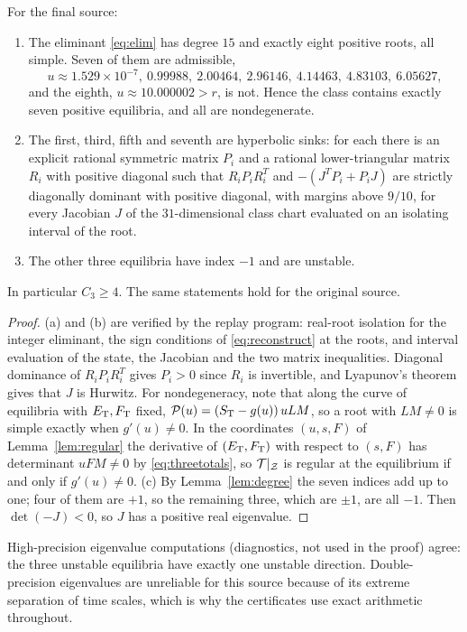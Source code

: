 \begin{proposition}\label{prop:foursinks}
For the final source:
\begin{enumerate}
\item[\textup{(a)}] The eliminant \eqref{eq:elim} has degree \(15\) and exactly eight positive
roots, all simple. Seven of them are admissible,
\[
 u\approx1.529\times10^{-7},\ 0.99988,\ 2.00464,\ 2.96146,\ 4.14463,\ 4.83103,\ 6.05627 ,
\]
and the eighth, \(u\approx10.000002>r\), is not. Hence the class contains exactly seven
positive equilibria, and all are nondegenerate.
\item[\textup{(b)}] The first, third, fifth and seventh are hyperbolic sinks: for each there is
an explicit rational symmetric matrix \(P_i\) and a rational lower-triangular matrix \(R_i\)
with positive diagonal such that \(R_iP_iR_i^T\) and \(-(J^TP_i+P_iJ)\) are strictly
diagonally dominant with positive diagonal, with margins above \(9/10\), for every Jacobian
\(J\) of the \(31\)-dimensional class chart evaluated on an isolating interval of the root.
\item[\textup{(c)}] The other three equilibria have index \(-1\) and are unstable.
\end{enumerate}
In particular \(C_3\ge4\). The same statements hold for the original source.
\end{proposition}
\begin{proof}
(a) and (b) are verified by the replay program: real-root isolation for the integer eliminant,
the sign conditions of \eqref{eq:reconstruct} at the roots, and interval evaluation of the
state, the Jacobian and the two matrix inequalities. Diagonal dominance of \(R_iP_iR_i^T\)
gives \(P_i>0\) since \(R_i\) is invertible, and Lyapunov's theorem gives that \(J\) is
Hurwitz. For nondegeneracy, note that along the curve of equilibria with \(E_{\mathrm T},F_{\mathrm T}\) fixed,
\(\mathcal P(u)=(S_{\mathrm T}-g(u))\,uLM\), so a root with \(LM\ne0\) is simple exactly when \(g'(u)\ne0\). In
the coordinates \((u,s,F)\) of Lemma~\ref{lem:regular} the derivative of \((E_{\mathrm T},F_{\mathrm T})\) with
respect to \((s,F)\) has determinant \(uFM\ne0\) by \eqref{eq:threetotals}, so \(\mathcal T|_\mathcal Z\) is
regular at the equilibrium if and only if \(g'(u)\ne0\). (c) By Lemma~\ref{lem:degree} the
seven indices add up to one; four of them are \(+1\), so the remaining three, which are
\(\pm1\), are all \(-1\). Then \(\det(-J)<0\), so \(J\) has a positive real eigenvalue.
\end{proof}
High-precision eigenvalue computations (diagnostics, not used in the proof) agree: the three
unstable equilibria have exactly one unstable direction. Double-precision eigenvalues are
unreliable for this source because of its extreme separation of time scales, which is why the
certificates use exact arithmetic throughout.

